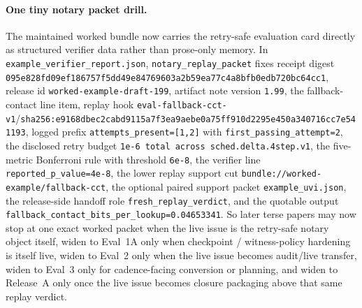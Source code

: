 \documentclass[11pt]{article}
\begin{document}
\paragraph{One tiny notary packet drill.}
The maintained worked bundle now carries the retry-safe evaluation card directly as structured verifier data rather than prose-only memory. In \nolinkurl{example_verifier_report.json}, \nolinkurl{notary_replay_packet} fixes receipt digest \nolinkurl{095e828fd09ef186757f5dd49e84769603a2b59ea77c4a8bfb0edb720bc64cc1}, release id \nolinkurl{worked-example-draft-199}, artifact note version \nolinkurl{1.99}, the fallback-contact line item, replay hook \nolinkurl{eval-fallback-cct-v1}/\nolinkurl{sha256:e9168dbec2cabd9115a7f3ea9aebe0a75ff910d2295e450a340716cc7e541193}, logged prefix \nolinkurl{attempts_present=[1,2]} with \nolinkurl{first_passing_attempt=2}, the disclosed retry budget \nolinkurl{1e-6 total across sched.delta.4step.v1}, the five-metric Bonferroni rule with threshold \nolinkurl{6e-8}, the verifier line \nolinkurl{reported_p_value=4e-8}, the lower replay support cut \nolinkurl{bundle://worked-example/fallback-cct}, the optional paired support packet \nolinkurl{example_uvi.json}, the release-side handoff role \nolinkurl{fresh_replay_verdict}, and the quotable output \nolinkurl{fallback_contact_bits_per_lookup=0.04653341}. So later terse papers may now stop at one exact worked packet when the live issue is the retry-safe notary object itself, widen to Eval~1A only when checkpoint / witness-policy hardening is itself live, widen to Eval~2 only when the live issue becomes audit/live transfer, widen to Eval~3 only for cadence-facing conversion or planning, and widen to Release~A only once the live issue becomes closure packaging above that same replay verdict.\cite{series:evalnotary,series:eval1A,series:advantagecontracts,series:eval3,series:releaseproperty,series:workedexample}
\end{document}
